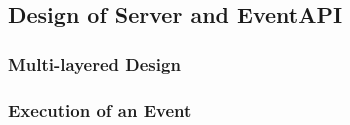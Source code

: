 \subsection{Design of Server and EventAPI}

\subsubsection{Multi-layered Design}

\subsubsection{Execution of an Event}